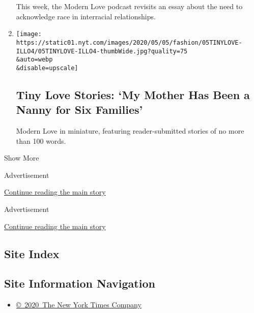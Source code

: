 \begin{enumerate}
  This week, the Modern Love podcast revisits an essay about the need to
  acknowledge race in interracial relationships.
\item
  \href{/2020/06/09/style/tiny-modern-love-stories-coronavirus-nanny-for-six-families.html}{}

  \texttt{[image: https://static01.nyt.com/images/2020/05/05/fashion/05TINYLOVE-ILLO4/05TINYLOVE-ILLO4-thumbWide.jpg?quality=75\\\&auto=webp\\\&disable=upscale]}

  \hypertarget{tiny-love-stories-my-mother-has-been-a-nanny-for-six-families}{%
  \subsection{Tiny Love Stories: `My Mother Has Been a Nanny for Six
  Families'}\label{tiny-love-stories-my-mother-has-been-a-nanny-for-six-families}}

  Modern Love in miniature, featuring reader-submitted stories of no
  more than 100 words.
\end{enumerate}

Show More

Advertisement

\protect\hyperlink{after-mid2}{Continue reading the main story}

Advertisement

\protect\hyperlink{after-mktg}{Continue reading the main story}

\hypertarget{site-index}{%
\subsection{Site Index}\label{site-index}}

\hypertarget{site-information-navigation}{%
\subsection{Site Information
Navigation}\label{site-information-navigation}}

\begin{itemize}
\tightlist
\item
  \href{https://help.nytimes.com/hc/en-us/articles/115014792127-Copyright-notice}{©~2020~The
  New York Times Company}
\end{itemize}

